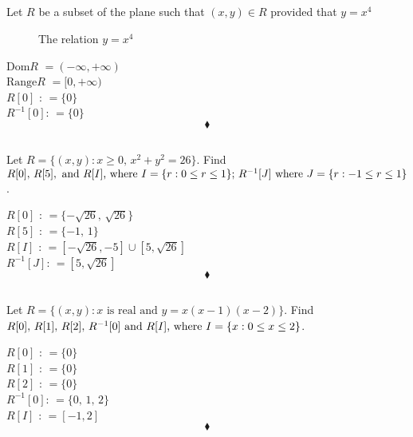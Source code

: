 \subsection{}
\begin{tcolorbox}
 Let $R$ be a subset of the plane such that $(x,y)\in R$ provided that $y=x^4$
\end{tcolorbox}
\begin{figure}[H]%
    \centering
    
\caption{The relation $y=x^4$}
\label{fig:fig_p8b}
\end{figure}
$$ $$
\textbf{$\text{Dom}R$} $=(-\infty,+\infty)$\\
\textbf{$\text{Range} R$} $=[0,+\infty)$\\
\textbf{$R[0]$ }:  $=\{0\}$\\
\textbf{$R^{-1}[0]$}:  $=\{0\}$\\
$$\blacklozenge$$


\subsection{}
\begin{tcolorbox}
 Let $R=\{(x,y):x\ge 0,\, x^2+y^2=26\}$. Find $R[0],\, R[5],\text{ and } R[I]\text{, where } I= \{r:0\le r\le 1\};\, R^{-1}[J]\text{ where } J=  \{r:-1\le r\le 1\}$.
\end{tcolorbox}
$$ $$
\textbf{$R[0]$ }:  $=\{-\sqrt{26},\,\sqrt{26} \}$\\
\textbf{$R[5]$ }:  $=\{-1,\,1 \}$\\
\textbf{$R[I]$ }:  $=[-\sqrt{26},-5]\cup [5,\sqrt{26}] $\\
\textbf{$R^{-1}[J]$}:  $=[5,\sqrt{26}]$\\
$$\blacklozenge$$

\subsection{}
\begin{tcolorbox}
 Let $R=\{(x,y):x\text{ is real and }y=x(x-1)(x-2)\}$. Find $R[0],\, R[1],\, R[2],\, R^{-1}[0]\text{ and } R[I]\text{, where } I= \{x:0\le x\le 2\}$.
\end{tcolorbox}
$$ $$ 
\textbf{$R[0]$ }:  $=\{0\}$\\
\textbf{$R[1]$ }: $=\{0 \}$\\
\textbf{$R[2]$ }:   $=\{0 \}$\\
\textbf{$R^{-1}[0]$}:  $=\{0,\, 1 ,\, 2 \}$\\
\textbf{$R[I]$ }:  $=[-1,2] $\\
$$\blacklozenge$$

